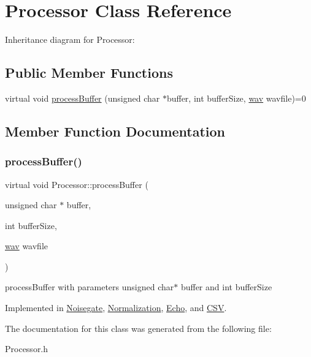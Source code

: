 \hypertarget{classProcessor}{}\section{Processor Class Reference}
\label{classProcessor}


Inheritance diagram for Processor\+:
\subsection*{Public Member Functions}
\begin{DoxyCompactItemize}
\item 
virtual void \hyperlink{classProcessor_ad81c2b75979636bcee7f5182cdb79a86}{process\+Buffer} (unsigned char $\ast$buffer, int buffer\+Size, \hyperlink{classwav}{wav} wavfile)=0
\end{DoxyCompactItemize}


\subsection{Member Function Documentation}
\mbox{\label{classProcessor_ad81c2b75979636bcee7f5182cdb79a86}} 
\subsubsection{\texorpdfstring{process\+Buffer()}{processBuffer()}}
{\footnotesize\ttfamily virtual void Processor\+::process\+Buffer (\begin{DoxyParamCaption}\item[{unsigned char $\ast$}]{buffer,  }\item[{int}]{buffer\+Size,  }\item[{\hyperlink{classwav}{wav}}]{wavfile }\end{DoxyParamCaption})\hspace{0.3cm}{\ttfamily [pure virtual]}}

process\+Buffer with parameters unsigned char$\ast$ buffer and int buffer\+Size 

Implemented in \hyperlink{classNoisegate_ad379f3e2ec1b28788dbf65f4f9a4427c}{Noisegate}, \hyperlink{classNormalization_ae2dd53014ffd6a1c197036587c9b8118}{Normalization}, \hyperlink{classEcho_af63c5069f6263bfb0a9f2b3ed0cef2f6}{Echo}, and \hyperlink{classCSV_a43b1da85359b104da24a2967f36936e6}{C\+SV}.



The documentation for this class was generated from the following file\+:\begin{DoxyCompactItemize}
\item 
Processor.\+h\end{DoxyCompactItemize}
